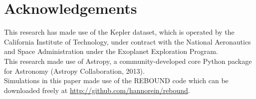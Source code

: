 \documentclass[12pt]{report}
\newcommand{\mnras}{MNRAS}
\newcommand{\aap}{A\&A}
\begin{document}
\section*{Acknowledgements}
This research has made use of the Kepler dataset, which is operated by the California Institute of Technology, under contract with the National Aeronautics and Space Administration under the Exoplanet Exploration Program. \vspace{0.5cm}\\
This research made use of Astropy, a community-developed core Python package for Astronomy (Astropy Collaboration, 2013).\vspace{0.5cm}\\
Simulations in this paper made use of the REBOUND code which can be downloaded freely at \url{http://github.com/hannorein/rebound}.



%
\end{document}
